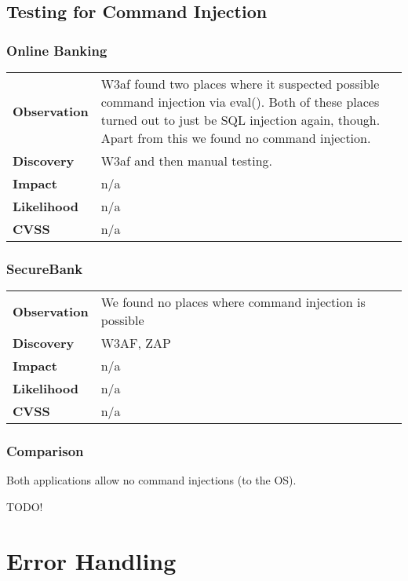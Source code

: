 \subsection{Testing for Command Injection}

\subsubsection*{Online Banking}

\begin{tabular}{l|p{10cm}}
\textbf{Observation} & W3af found two places where it suspected possible command injection via eval(). Both of these places turned out to just be SQL injection again, though. Apart from this we found no command injection.\\
\textbf{Discovery} & W3af and then manual testing.\\
\textbf{Impact} & n/a \\
\textbf{Likelihood} & n/a \\
\textbf{CVSS} & n/a \\
\end{tabular}

\subsubsection*{SecureBank}

\begin{tabular}{l|p{10cm}}
\textbf{Observation} & We found no places where command injection is possible\\
\textbf{Discovery} & W3AF, ZAP\\
\textbf{Impact} & n/a \\
\textbf{Likelihood} & n/a \\
\textbf{CVSS} & n/a \\
\end{tabular}

\subsubsection*{Comparison}
Both applications allow no command injections (to the OS).

TODO!

\clearpage



\section{Error Handling}


